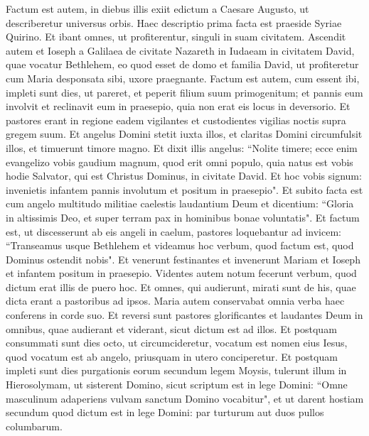\begin{biblechapter}  
\verse Factum est autem, in diebus illis exiit edictum a Caesare Augusto, ut describeretur universus orbis. 
\verse Haec descriptio prima facta est praeside Syriae Quirino. 
\verse Et ibant omnes, ut profiterentur, singuli in suam civitatem. 
\verse Ascendit autem et Ioseph a Galilaea de civitate Nazareth in Iudaeam in civitatem David, quae vocatur Bethlehem, eo quod esset de domo et familia David, 
\verse ut profiteretur cum Maria desponsata sibi, uxore praegnante. 
\verse Factum est autem, cum essent ibi, impleti sunt dies, ut pareret, 
\verse et peperit filium suum primogenitum; et pannis eum involvit et reclinavit eum in praesepio, quia non erat eis locus in deversorio. 
\verse Et pastores erant in regione eadem vigilantes et custodientes vigilias noctis supra gregem suum. 
\verse Et angelus Domini stetit iuxta illos, et claritas Domini circumfulsit illos, et timuerunt timore magno. 
\verse Et dixit illis angelus: “Nolite timere; ecce enim evangelizo vobis gaudium magnum, quod erit omni populo, 
\verse quia natus est vobis hodie Salvator, qui est Christus Dominus, in civitate David. 
\verse Et hoc vobis signum: invenietis infantem pannis involutum et positum in praesepio". 
\verse Et subito facta est cum angelo multitudo militiae caelestis laudantium Deum et dicentium: 
\verse “Gloria in altissimis Deo, et super terram pax in hominibus bonae voluntatis". 
\verse Et factum est, ut discesserunt ab eis angeli in caelum, pastores loquebantur ad invicem: “Transeamus usque Bethlehem et videamus hoc verbum, quod factum est, quod Dominus ostendit nobis". 
\verse Et venerunt festinantes et invenerunt Mariam et Ioseph et infantem positum in praesepio. 
\verse Videntes autem notum fecerunt verbum, quod dictum erat illis de puero hoc. 
\verse Et omnes, qui audierunt, mirati sunt de his, quae dicta erant a pastoribus ad ipsos. 
\verse Maria autem conservabat omnia verba haec conferens in corde suo. 
\verse Et reversi sunt pastores glorificantes et laudantes Deum in omnibus, quae audierant et viderant, sicut dictum est ad illos. 
\verse Et postquam consummati sunt dies octo, ut circumcideretur, vocatum est nomen eius Iesus, quod vocatum est ab angelo, priusquam in utero conciperetur. 
\verse Et postquam impleti sunt dies purgationis eorum secundum legem Moysis, tulerunt illum in Hierosolymam, ut sisterent Domino, 
\verse sicut scriptum est in lege Domini: “Omne masculinum adaperiens vulvam sanctum Domino vocabitur", 
\verse et ut darent hostiam secundum quod dictum est in lege Domini: par turturum aut duos pullos columbarum. 

\end{biblechapter}
